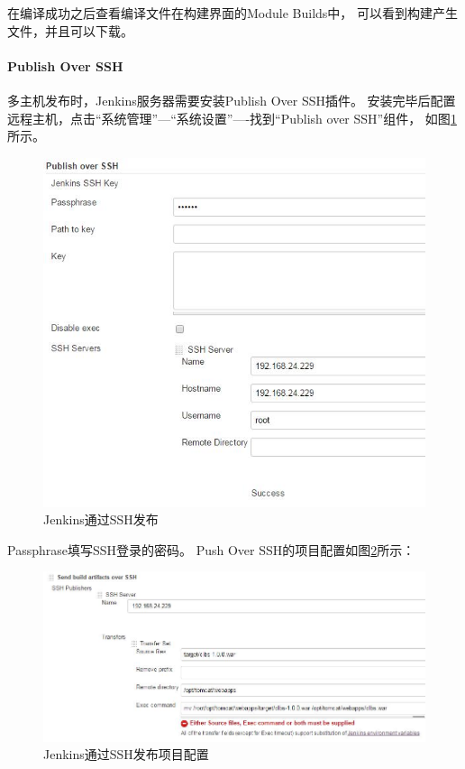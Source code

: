 \documentclass{book}
\begin{document}
在编译成功之后查看编译文件在构建界面的Module Builds中，
可以看到构建产生文件，并且可以下载。

\paragraph{Publish Over SSH}

多主机发布时，Jenkins服务器需要安装Publish Over SSH插件。
安装完毕后配置远程主机，点击“系统管理”---“系统设置”----找到“Publish over SSH”组件，
如图\ref{fig:JenkinsPublishOverSSHConfiguration}所示。

\begin{figure}[htbp]
	\centering
	\includegraphics[scale=0.5]{JenkinsPublishOverSSHConfiguration.jpg}
	\caption{Jenkins通过SSH发布}
	\label{fig:JenkinsPublishOverSSHConfiguration}
\end{figure}

Passphrase填写SSH登录的密码。
Push Over SSH的项目配置如图\ref{fig:JenkinsPublishOverSSHProjConfig}所示：

\begin{figure}[htbp]
	\centering
	\includegraphics[scale=0.5]{JenkinsPublishOverSSHProjConfig.jpg}
	\caption{Jenkins通过SSH发布项目配置}
	\label{fig:JenkinsPublishOverSSHProjConfig}
\end{figure}
\end{document}
